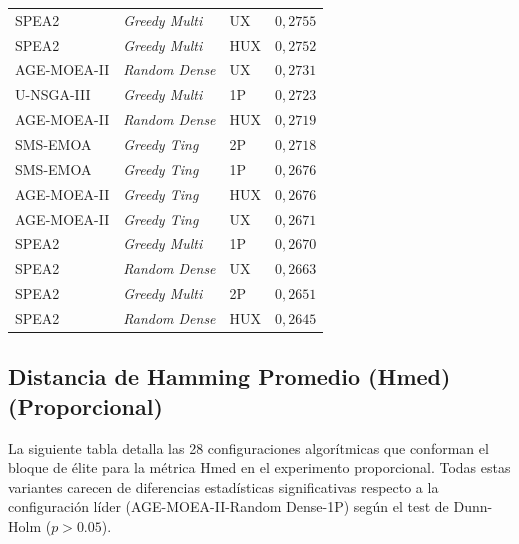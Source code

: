 \begin{longtable}{lllc}
SPEA2 & \textit{Greedy Multi} & UX & $0{,}2755$ \\
SPEA2 & \textit{Greedy Multi} & HUX & $0{,}2752$ \\
AGE-MOEA-II & \textit{Random Dense} & UX & $0{,}2731$ \\
U-NSGA-III & \textit{Greedy Multi} & 1P & $0{,}2723$ \\
AGE-MOEA-II & \textit{Random Dense} & HUX & $0{,}2719$ \\
SMS-EMOA & \textit{Greedy Ting} & 2P & $0{,}2718$ \\
SMS-EMOA & \textit{Greedy Ting} & 1P & $0{,}2676$ \\
AGE-MOEA-II & \textit{Greedy Ting} & HUX & $0{,}2676$ \\
AGE-MOEA-II & \textit{Greedy Ting} & UX & $0{,}2671$ \\
SPEA2 & \textit{Greedy Multi} & 1P & $0{,}2670$ \\
SPEA2 & \textit{Random Dense} & UX & $0{,}2663$ \\
SPEA2 & \textit{Greedy Multi} & 2P & $0{,}2651$ \\
SPEA2 & \textit{Random Dense} & HUX & $0{,}2645$ \\
\end{longtable}

\subsection{Distancia de Hamming Promedio (Hmed) (Proporcional)}\label{anexo:elite_avghd_prop}

La siguiente tabla detalla las 28 configuraciones algorítmicas que conforman el bloque de élite para la métrica Hmed en el experimento proporcional. Todas estas variantes carecen de diferencias estadísticas significativas respecto a la configuración líder (AGE-MOEA-II-Random Dense-1P) según el test de Dunn-Holm ($p > 0.05$).

